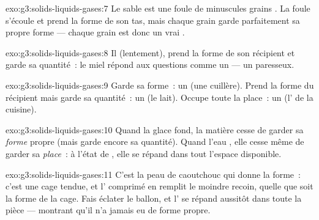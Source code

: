 \begin{solution}{exo:g3:solids-liquids-gases:7}
Le sable est une foule de minuscules grains . La foule
s'écoule et prend la forme de son tas, mais chaque grain garde
parfaitement sa propre forme --- chaque grain est donc un vrai
.
\end{solution}

\begin{solution}{exo:g3:solids-liquids-gases:8}
Il  (lentement), prend la forme de son récipient et garde sa
quantité~: le miel répond aux questions comme un  --- un
 paresseux.
\end{solution}

\begin{solution}{exo:g3:solids-liquids-gases:9}
Garde sa forme~: un  (une cuillère). Prend la forme du
récipient mais garde sa quantité~: un  (le lait). Occupe toute
la place~: un  (l' de la cuisine).
\end{solution}

\begin{solution}{exo:g3:solids-liquids-gases:10}
Quand la glace fond, la matière cesse de garder sa \emph{forme}
propre (mais garde encore sa quantité). Quand l'eau , elle
cesse même de garder sa \emph{place}~: à l'état de , elle se
répand dans tout l'espace disponible.
\end{solution}

\begin{solution}{exo:g3:solids-liquids-gases:11}
C'est la peau de caoutchouc qui donne la forme~: c'est une cage
 tendue, et l' comprimé en remplit le moindre recoin, quelle
que soit la forme de la cage. Fais éclater le ballon, et l' se
répand aussitôt dans toute la pièce --- montrant qu'il n'a jamais eu
de forme propre.
\end{solution}
